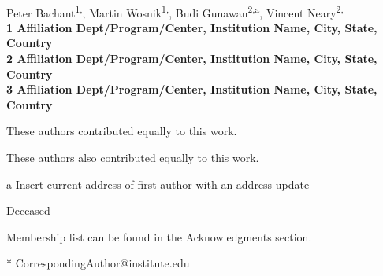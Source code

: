 \documentclass[10pt,letterpaper]{article}
\date{}
\begin{document}
\vspace*{0.35in}

\begin{flushleft}

{\Large \textbf{}}
\newline
\\
Peter Bachant\textsuperscript{1,\Yinyang},
Martin Wosnik\textsuperscript{1,\Yinyang},
Budi Gunawan\textsuperscript{2,\textcurrency a},
Vincent Neary\textsuperscript{2,\ddag}
\\
\bigskip
\bf{1} Affiliation Dept/Program/Center, Institution Name, City, State, Country
\\
\bf{2} Affiliation Dept/Program/Center, Institution Name, City, State, Country
\\
\bf{3} Affiliation Dept/Program/Center, Institution Name, City, State, Country
\\
\bigskip

%
%
\Yinyang These authors contributed equally to this work.

\ddag These authors also contributed equally to this work.

\textcurrency a Insert current address of first author with an address update

\dag Deceased

\textpilcrow Membership list can be found in the Acknowledgments section.

* CorrespondingAuthor@institute.edu

\end{flushleft}
\end{document}
